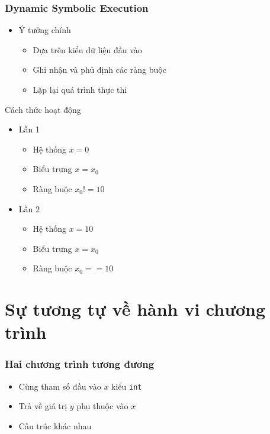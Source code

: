 \documentclass{beamer}
\begin{document}
\begin{frame}
  \frametitle{Dynamic Symbolic Execution}   
  \begin{itemize}
  	\item Ý tưởng chính
  	\begin{itemize}
  	\item Dựa trên kiểu dữ liệu đầu vào
	\item Ghi nhận và phủ định các ràng buộc
  	\item Lặp lại quá trình thực thi
  	\end{itemize}
  \end{itemize}

  \begin{exampleblock}{Cách thức hoạt động}
	\begin{minipage}{0.45\linewidth}
	
	\end{minipage}
	\hfill
	\begin{minipage}{0.50\linewidth}
	\begin{itemize}
		\item Lần 1
		\begin{itemize}
			\item Hệ thống $ x = 0 $
			\item Biểu trưng $ x = x_{0} $
			\item Ràng buộc $ x_{0} != 10 $
		\end{itemize}
		\item Lần 2
		\begin{itemize}
			\item Hệ thống $ x = 10 $
			\item Biểu trưng $ x = x_{0} $
			\item Ràng buộc $ x_{0} == 10 $
		\end{itemize}
	\end{itemize}		
	\end{minipage}
  \end{exampleblock}
	
\end{frame}

\section{Sự tương tự về hành vi chương trình}
\begin{frame}
	\frametitle{Hai chương trình tương đương}
	\begin{minipage}[t]{0.48\linewidth}
	
	\end{minipage}
	\hfill
	\begin{minipage}[t]{0.48\linewidth}
	
	\end{minipage}
	\begin{itemize}
		\item Cùng tham số đầu vào $ x $ kiểu \texttt{int}
		\item Trả về giá trị $ y $ phụ thuộc vào $ x $
		\item Cấu trúc khác nhau
	\end{itemize}
\end{frame}
\end{document}
